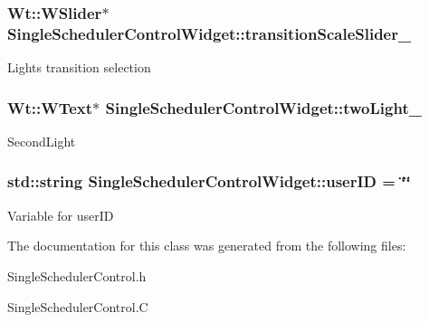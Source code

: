 \subsubsection[{\texorpdfstring{transition\+Scale\+Slider\+\_\+}{transitionScaleSlider_}}]{\setlength{\rightskip}{0pt plus 5cm}Wt\+::\+W\+Slider$\ast$ Single\+Scheduler\+Control\+Widget\+::transition\+Scale\+Slider\+\_\+\hspace{0.3cm}{\ttfamily [private]}}\hypertarget{classSingleSchedulerControlWidget_a5d56e0945847bd44dc494842b7ac8c58}{}\label{classSingleSchedulerControlWidget_a5d56e0945847bd44dc494842b7ac8c58}
Light\textquotesingle{}s transition selection 
\subsubsection[{\texorpdfstring{two\+Light\+\_\+}{twoLight_}}]{\setlength{\rightskip}{0pt plus 5cm}Wt\+::\+W\+Text$\ast$ Single\+Scheduler\+Control\+Widget\+::two\+Light\+\_\+\hspace{0.3cm}{\ttfamily [private]}}\hypertarget{classSingleSchedulerControlWidget_a37a5c0996f517813a1b0ffdcaf67108b}{}\label{classSingleSchedulerControlWidget_a37a5c0996f517813a1b0ffdcaf67108b}
Second\+Light 
\subsubsection[{\texorpdfstring{user\+ID}{userID}}]{\setlength{\rightskip}{0pt plus 5cm}std\+::string Single\+Scheduler\+Control\+Widget\+::user\+ID = \char`\"{}\char`\"{}\hspace{0.3cm}{\ttfamily [private]}}\hypertarget{classSingleSchedulerControlWidget_ae067a0f04e22f78c73a5a372661ecc68}{}\label{classSingleSchedulerControlWidget_ae067a0f04e22f78c73a5a372661ecc68}
Variable for user\+ID 

The documentation for this class was generated from the following files\+:\begin{DoxyCompactItemize}
\item 
Single\+Scheduler\+Control.\+h\item 
Single\+Scheduler\+Control.\+C\end{DoxyCompactItemize}
